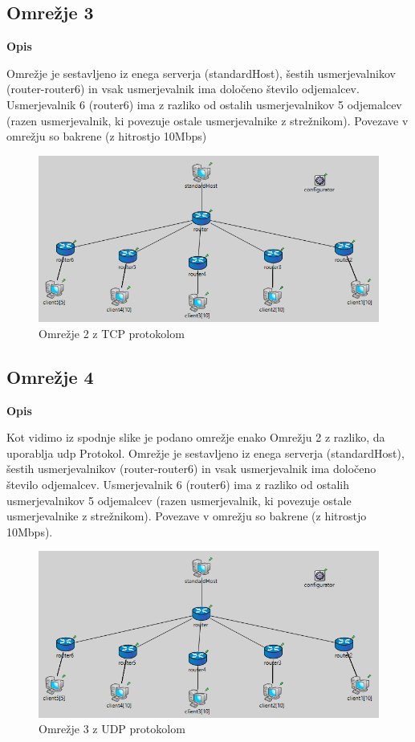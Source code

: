 \documentclass[a4paper,11pt]{article}
\begin{document}
\subsection{Omrežje 3}
\large \bf Opis \par
\normalfont \normalsize
Omrežje je sestavljeno iz enega serverja (standardHost), šestih usmerjevalnikov (router-router6) in vsak usmerjevalnik ima določeno število odjemalcev. Usmerjevalnik 6 (router6) ima z razliko od ostalih usmerjevalnikov 5 odjemalcev (razen usmerjevalnik, ki povezuje ostale usmerjevalnike z strežnikom). Povezave v omrežju so bakrene (z hitrostjo 10Mbps)

\begin{figure}[h]
	\centering
	\includegraphics[width=\textwidth]{server_client.png}
	\caption{Omrežje 2 z TCP protokolom}
	\label{omrezje2}	
\end{figure}

\subsection{Omrežje 4}
\large \bf Opis \par
\normalfont \normalsize
Kot vidimo iz spodnje slike je podano omrežje enako Omrežju 2 z razliko, da uporablja udp Protokol. Omrežje je sestavljeno iz enega serverja (standardHost), šestih usmerjevalnikov (router-router6) in vsak usmerjevalnik ima določeno število odjemalcev. Usmerjevalnik 6 (router6) ima z razliko od ostalih usmerjevalnikov 5 odjemalcev (razen usmerjevalnik, ki povezuje ostale usmerjevalnike z strežnikom). Povezave v omrežju so bakrene (z hitrostjo 10Mbps).

\begin{figure}[h]
	\centering
	\includegraphics[width=\textwidth]{server_client.png}
	\caption{Omrežje 3 z UDP protokolom}
	\label{omrezje3}	
\end{figure}
\end{document}
